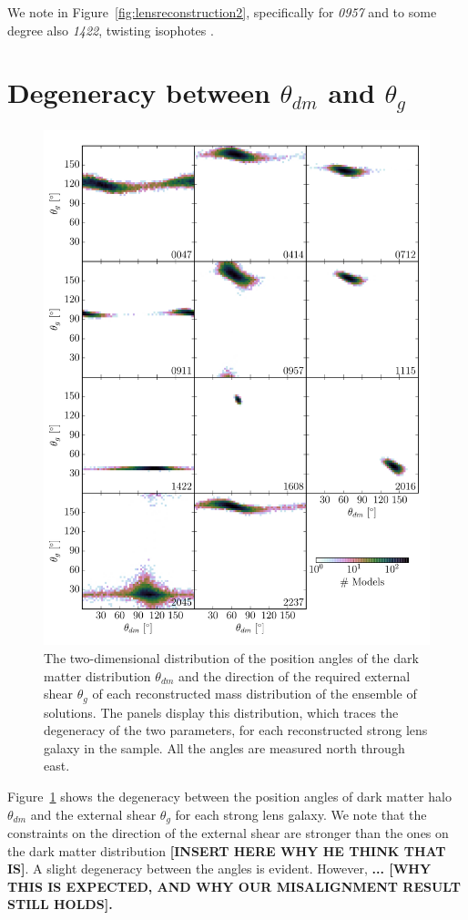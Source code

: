 \documentclass[useAMS,usenatbib]{mn2e}
\begin{document}
We note in Figure~\ref{fig:lensreconstruction2}, specifically for {\it0957} and to some degree also {\it1422}, twisting isophotes \citep[e.g.][]{1978ComAp...8...27B}.

\section{Degeneracy between $\theta_{dm}$ and $\theta_{g}$}\label{sec:shearshapedeg}
\begin{figure}
  \centering
  \includegraphics[width=.9\linewidth]{Figures/theta_scatter.pdf}
  \caption[width=\linewidth]{The two-dimensional distribution of the position angles of the dark matter distribution $\theta_{dm}$ and the direction of the required external shear $\theta_{g}$ of each reconstructed mass distribution of the ensemble of solutions. The panels display this distribution, which traces the degeneracy of the two parameters, for each reconstructed strong lens galaxy in the sample. All the angles are measured north through east.}
  \label{fig:thetascatter}
\end{figure}

Figure~\ref{fig:thetascatter} shows the degeneracy between the position angles of dark matter halo $\theta_{dm}$ and the external shear $\theta_{g}$ for each strong lens galaxy. We note that the constraints on the direction of the external shear are stronger than the ones on the dark matter distribution \textbf{[INSERT HERE WHY HE THINK THAT IS]}. A slight degeneracy between the angles is evident. However, \textbf{... [WHY THIS IS EXPECTED, AND WHY OUR MISALIGNMENT RESULT STILL HOLDS].}
\end{document}
